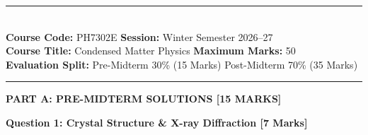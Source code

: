 \documentclass[11pt,a4paper]{article}
\begin{document}
\noindent
\rule{\textwidth}{1.0pt}\\[3pt]
\noindent
\textbf{Course Code:} PH7302E \hfill \textbf{Session:} Winter Semester 2026--27 \\
\textbf{Course Title:} Condensed Matter Physics \hfill \textbf{Maximum Marks:} 50 \\
\textbf{Evaluation Split:} Pre-Midterm 30\% (15 Marks) \hfill Post-Midterm 70\% (35 Marks)
\vspace{2pt}
\rule{\textwidth}{0.5pt}

\vspace{2pt}
\vspace{4pt}

\vspace{6pt}
\begin{center}
    {\large\bfseries PART A: PRE-MIDTERM SOLUTIONS [15 MARKS]}
\end{center}

\vspace{4pt}
\noindent\textbf{Question 1: Crystal Structure \& X-ray Diffraction [7 Marks]}
\vspace{4pt}
\end{document}
